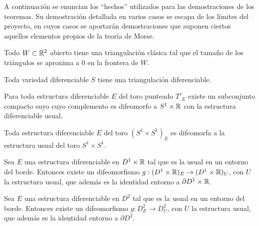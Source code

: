 
A continuación se enuncian los ``hechos'' utilizados para las demostraciones de los teoremas. Su demostración detallada en varios casos se escapa de los límites del proyecto, en cuyos casos se aportarán demostraciones que suponen ciertos aquellos elementos propios de la teoría de Morse.

\begin{hecho}
	Todo $W \subset \mathbb{R}^2$ abierto tiene una triangulación clásica tal que el tamaño de los triángulos se aproxima a $0$ en la frontera de $W$.
\end{hecho}

\begin{hecho}
	Toda variedad diferenciable $S$ tiene una triangulación diferenciable.
\end{hecho}

\begin{hecho}
	Para toda estructura diferenciable $E$ del toro punteado $T'_E$ existe un subconjunto compacto suyo cuyo complemento es difeomorfo a $S^1 \times \mathbb{R}$ con la estructura diferenciable usual.
\end{hecho}

\begin{hecho}
	Toda estructura diferenciable $E$ del toro $(S^1 \times S^1)_E$ es difeomorfa a la estructura usual del toro $S^1 \times S^1$.
\end{hecho}

\begin{hecho}
	Sea $E$ una estructura diferenciable en $D^1 \times \mathbb{R}$ tal que es la usual en un entorno del borde. Entonces existe un difeomorfismo $g:(D^1 \times \mathbb{R})_E \rightarrow (D^1 \times \mathbb{R})_U$, con $U$ la estructura usual, que además es la identidad entorno a $\partial D^1 \times \mathbb{R}$.
\end{hecho}

\begin{hecho}
	Sea $E$ una estructura diferenciable en $D^2$ tal que es la usual en un entorno del borde. Entonces existe un difeomorfismo $g:D^2_E \rightarrow D^2_U$, con $U$ la estructura usual, que además es la identidad entorno a $\partial D^2$.
\end{hecho}



\endinput
